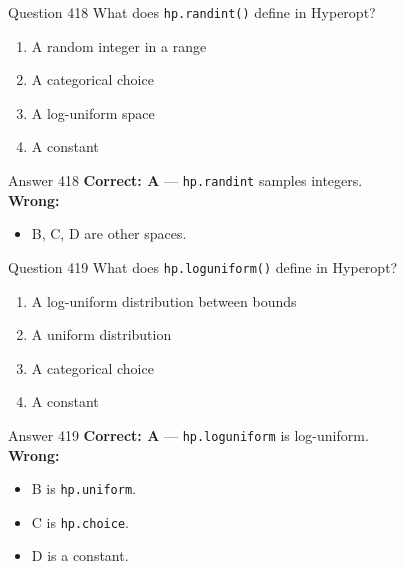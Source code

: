 \documentclass[aspectratio=169,11pt]{beamer}
\begin{document}
	\begin{frame}{Question 418}
		What does \texttt{hp.randint()} define in Hyperopt?
		\begin{enumerate}[label=\Alph*.]
			\item A random integer in a range
			\item A categorical choice
			\item A log-uniform space
			\item A constant
		\end{enumerate}
	\end{frame}
	\begin{frame}{Answer 418}
		\textbf{Correct: A} --- \texttt{hp.randint} samples integers.\\
		\vspace{0.5em}
		\textbf{Wrong:}
		\begin{itemize}
			\item B, C, D are other spaces.
		\end{itemize}
	\end{frame}
	
	\begin{frame}{Question 419}
		What does \texttt{hp.loguniform()} define in Hyperopt?
		\begin{enumerate}[label=\Alph*.]
			\item A log-uniform distribution between bounds
			\item A uniform distribution
			\item A categorical choice
			\item A constant
		\end{enumerate}
	\end{frame}
	\begin{frame}{Answer 419}
		\textbf{Correct: A} --- \texttt{hp.loguniform} is log-uniform.\\
		\vspace{0.5em}
		\textbf{Wrong:}
		\begin{itemize}
			\item B is \texttt{hp.uniform}.
			\item C is \texttt{hp.choice}.
			\item D is a constant.
		\end{itemize}
	\end{frame}
	
\end{document}
